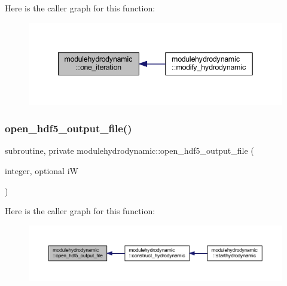 Here is the caller graph for this function\+:\nopagebreak
\begin{figure}[H]
\begin{center}
\leavevmode
\includegraphics[width=342pt]{namespacemodulehydrodynamic_a054b8ffaff698f4cc430c2f7f0bc0da9_icgraph}
\end{center}
\end{figure}
\mbox{\label{namespacemodulehydrodynamic_a381b9a6e56cf40fbb60e681f7874c983}} 
\subsubsection{\texorpdfstring{open\+\_\+hdf5\+\_\+output\+\_\+file()}{open\_hdf5\_output\_file()}}
{\footnotesize\ttfamily subroutine, private modulehydrodynamic\+::open\+\_\+hdf5\+\_\+output\+\_\+file (\begin{DoxyParamCaption}\item[{integer, optional}]{iW }\end{DoxyParamCaption})\hspace{0.3cm}{\ttfamily [private]}}

Here is the caller graph for this function\+:\nopagebreak
\begin{figure}[H]
\begin{center}
\leavevmode
\includegraphics[width=350pt]{namespacemodulehydrodynamic_a381b9a6e56cf40fbb60e681f7874c983_icgraph}
\end{center}
\end{figure}
\mbox{\label{namespacemodulehydrodynamic_a8cd8ea126b12cb779766bcdbe905b6b0}} 
